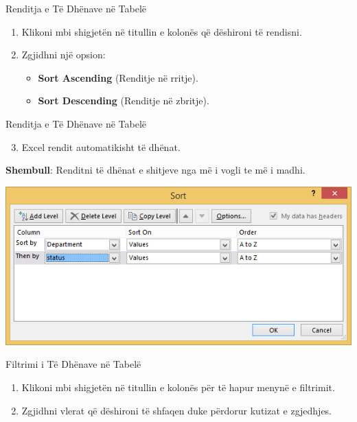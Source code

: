 \documentclass[
  ignorenonframetext,
]{beamer}
\providecommand{\tightlist}{%
  \setlength{\itemsep}{0pt}\setlength{\parskip}{0pt}}
\begin{document}
\begin{frame}{Renditja e Të Dhënave në Tabelë}
\label{renditja-e-tuxeb-dhuxebnave-nuxeb-tabeluxeb}
\begin{enumerate}
\item
  Klikoni mbi shigjetën në titullin e kolonës që dëshironi të rendisni.
\item
  Zgjidhni një opsion:

  \begin{itemize}
  \item
    \textbf{Sort Ascending} (Renditje në rritje).
  \item
    \textbf{Sort Descending} (Renditje në zbritje).
  \end{itemize}
\end{enumerate}
\end{frame}

\begin{frame}{Renditja e Të Dhënave në Tabelë}
\label{renditja-e-tuxeb-dhuxebnave-nuxeb-tabeluxeb-1}
\begin{enumerate}
\setcounter{enumi}{2}
\tightlist
\item
  Excel rendit automatikisht të dhënat.
\end{enumerate}

\textbf{Shembull}: Renditni të dhënat e shitjeve nga më i vogli te më i
madhi.

\includegraphics{./images/excel14.png}
\end{frame}

\begin{frame}{Filtrimi i Të Dhënave në Tabelë}
\label{filtrimi-i-tuxeb-dhuxebnave-nuxeb-tabeluxeb}
\begin{enumerate}
\item
  Klikoni mbi shigjetën në titullin e kolonës për të hapur menynë e
  filtrimit.
\item
  Zgjidhni vlerat që dëshironi të shfaqen duke përdorur kutizat e
  zgjedhjes.
\end{enumerate}
\end{frame}
\end{document}
